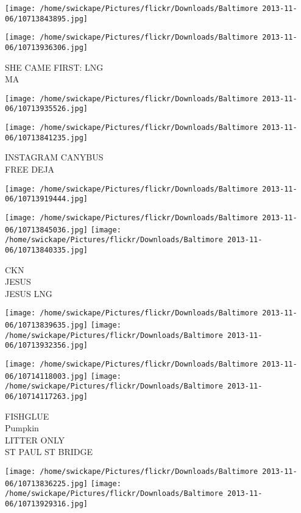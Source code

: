 \documentclass[10pt,letterpaper]{article}
\begin{document}
\texttt{[image: /home/swickape/Pictures/flickr/Downloads/Baltimore 2013-11-06/10713843895.jpg]}

\vspace{0.25in}
\texttt{[image: /home/swickape/Pictures/flickr/Downloads/Baltimore 2013-11-06/10713936306.jpg]}

SHE CAME FIRST: LNG\\
MA\\
\pagebreak

\texttt{[image: /home/swickape/Pictures/flickr/Downloads/Baltimore 2013-11-06/10713935526.jpg]}

\vspace{0.25in}
\texttt{[image: /home/swickape/Pictures/flickr/Downloads/Baltimore 2013-11-06/10713841235.jpg]}

INSTAGRAM CANYBUS\\
FREE DEJA\\
\pagebreak

\texttt{[image: /home/swickape/Pictures/flickr/Downloads/Baltimore 2013-11-06/10713919444.jpg]}

\vspace{0.25in}
\texttt{[image: /home/swickape/Pictures/flickr/Downloads/Baltimore 2013-11-06/10713845036.jpg]}
\texttt{[image: /home/swickape/Pictures/flickr/Downloads/Baltimore 2013-11-06/10713840335.jpg]}

CKN\\
JESUS\\
JESUS LNG\\
\pagebreak

\texttt{[image: /home/swickape/Pictures/flickr/Downloads/Baltimore 2013-11-06/10713839635.jpg]}
\texttt{[image: /home/swickape/Pictures/flickr/Downloads/Baltimore 2013-11-06/10713932356.jpg]}

\texttt{[image: /home/swickape/Pictures/flickr/Downloads/Baltimore 2013-11-06/10714118003.jpg]}
\texttt{[image: /home/swickape/Pictures/flickr/Downloads/Baltimore 2013-11-06/10714117263.jpg]}

FISHGLUE\\
Pumpkin\\
LITTER ONLY\\
ST PAUL ST BRIDGE\\
\pagebreak

\texttt{[image: /home/swickape/Pictures/flickr/Downloads/Baltimore 2013-11-06/10713836225.jpg]}
\texttt{[image: /home/swickape/Pictures/flickr/Downloads/Baltimore 2013-11-06/10713929316.jpg]}
\end{document}
